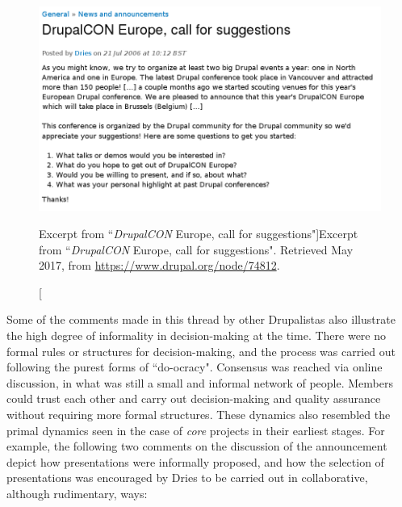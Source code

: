 \begin{figure}[H]
  \centering
\includegraphics[width=\textwidth]{img/quotes_replacement/dcon_2006_dries.png}
\caption[Excerpt from ``\textit{DrupalCON} Europe, call for suggestions"]{Excerpt from ``\textit{DrupalCON} Europe, call for suggestions". Retrieved  May 2017, from \url{https://www.drupal.org/node/74812}.}
\label{dcon2006}
\end{figure}

Some of the comments made in this thread by other Drupalistas also illustrate the high degree of informality in decision-making at the time. There were no formal rules or structures for decision-making, and the process was carried out following the purest forms of ``do-ocracy". Consensus was reached via online discussion, in what was still a small and informal network of people. Members could trust each other and carry out decision-making and quality assurance without requiring more formal structures. These dynamics also resembled the primal dynamics seen in the case of \textit{core} projects in their earliest stages. For example, the following two comments on the discussion of the announcement depict how presentations were informally proposed, and how the selection of presentations was encouraged by Dries to be carried out in collaborative, although rudimentary, ways:

